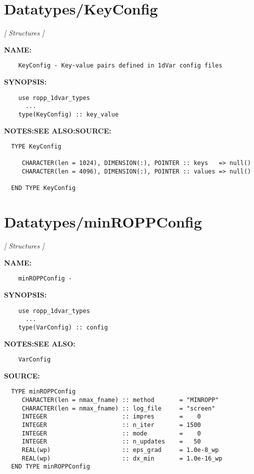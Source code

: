 \section{Datatypes/KeyConfig}
\textsl{[ Structures ]}

\label{ch:robo7}
\label{ch:Datatypes_KeyConfig}
\textbf{NAME:}\hspace{0.08in}\begin{Verbatim}
    KeyConfig - Key-value pairs defined in 1dVar config files
\end{Verbatim}
\textbf{SYNOPSIS:}\hspace{0.08in}\begin{Verbatim}
    use ropp_1dvar_types
      ...
    type(KeyConfig) :: key_value
\end{Verbatim}
\textbf{NOTES:}\hspace{0.08in}\textbf{SEE ALSO:}\hspace{0.08in}\textbf{SOURCE:}\hspace{0.08in}\begin{Verbatim}
  TYPE KeyConfig

     CHARACTER(len = 1024), DIMENSION(:), POINTER :: keys   => null()
     CHARACTER(len = 4096), DIMENSION(:), POINTER :: values => null()

  END TYPE KeyConfig
\end{Verbatim}
\section{Datatypes/minROPPConfig}
\textsl{[ Structures ]}

\label{ch:robo8}
\label{ch:Datatypes_minROPPConfig}
\textbf{NAME:}\hspace{0.08in}\begin{Verbatim}
    minROPPConfig - 
\end{Verbatim}
\textbf{SYNOPSIS:}\hspace{0.08in}\begin{Verbatim}
    use ropp_1dvar_types
      ...
    type(VarConfig) :: config
\end{Verbatim}
\textbf{NOTES:}\hspace{0.08in}\textbf{SEE ALSO:}\hspace{0.08in}\begin{Verbatim}
    VarConfig
\end{Verbatim}
\textbf{SOURCE:}\hspace{0.08in}\begin{Verbatim}
  TYPE minROPPConfig
     CHARACTER(len = nmax_fname) :: method       = "MINROPP"
     CHARACTER(len = nmax_fname) :: log_file     = "screen"
     INTEGER                     :: impres       =    0
     INTEGER                     :: n_iter       = 1500
     INTEGER                     :: mode         =    0
     INTEGER                     :: n_updates    =   50
     REAL(wp)                    :: eps_grad     = 1.0e-8_wp
     REAL(wp)                    :: dx_min       = 1.0e-16_wp
  END TYPE minROPPConfig
\end{Verbatim}

